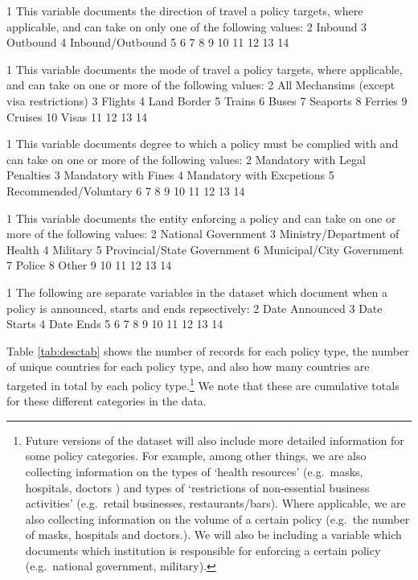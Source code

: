 \documentclass[]{article}
\let\rmarkdownfootnote\footnote%
\def\footnote{\protect\rmarkdownfootnote}
\begin{document}
1 This variable documents the direction of travel a policy targets, where applicable, and can take on only one of the following values:
2 Inbound
3 Outbound
4 Inbound/Outbound
5
6
7
8
9
10
11
12
13
14

1 This variable documents the mode of travel a policy targets, where applicable, and can take on one or more of the following values:
2 All Mechansims (except visa restrictions)
3 Flights
4 Land Border
5 Trains
6 Buses
7 Seaports
8 Ferries
9 Cruises
10 Visas
11
12
13
14

1 This variable documents degree to which a policy must be complied with and can take on one or more of the following values:
2 Mandatory with Legal Penalties
3 Mandatory with Fines
4 Mandatory with Excpetions
5 Recommended/Voluntary
6
7
8
9
10
11
12
13
14

1 This variable documents the entity enforcing a policy and can take on one or more of the following values:
2 National Government
3 Ministry/Department of Health
4 Military
5 Provincial/State Government
6 Municipal/City Government
7 Police
8 Other
9
10
11
12
13
14

1 The following are separate variables in the dataset which document when a policy is announced, starts and ends repsectively:
2 Date Announced
3 Date Starts
4 Date Ends
5
6
7
8
9
10
11
12
13
14

Table \ref{tab:desctab} shows the number of records for each policy type, the number of unique countries for each policy type, and also how many countries are targeted in total by each policy type.\footnote{Future versions of the dataset will also include more detailed information for some policy categories. For example, among other things, we are also collecting information on the types of `health resources' (e.g.~masks, hospitals, doctors ) and types of `restrictions of non-essential business activities' (e.g.~retail businesses, restaurants/bars). Where applicable, we are also collecting information on the volume of a certain policy (e.g.~the number of masks, hospitals and doctors.). We will also be including a variable which documents which institution is responsible for enforcing a certain policy (e.g.~national government, military).} We note that these are cumulative totals for these different categories in the data.
\end{document}
